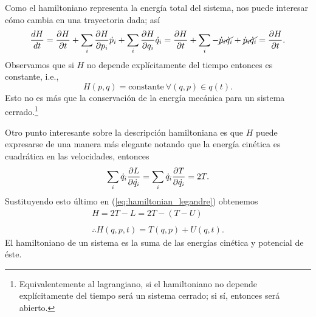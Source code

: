 Como el hamiltoniano representa la energía total del sistema, nos puede interesar cómo cambia en una trayectoria dada; así 
\begin{equation*}
 \frac{dH}{dt} = \frac{\partial H}{\partial t} + \sum_i \frac{\partial H}{\partial p_i}\dot{p}_i + \sum_i \frac{\partial H}{\partial q_i}\dot{q}_i = \frac{\partial H}{\partial t} + \sum_i - \cancel{\dot{p}_i\dot{q}_i} + \cancel{\dot{p}_i\dot{q}_i} = \frac{\partial H}{\partial t}.
\end{equation*}
Observamos que si $H$ no depende explícitamente del tiempo entonces es constante, i.e.,
\begin{equation*}
 H(p,q) = \text{constante} \ \forall (q,p) \in q(t).
\end{equation*} Esto no es más que la conservación de la energía mecánica para un sistema cerrado.\footnote{Equivalentemente al lagrangiano, si el hamiltoniano no depende explícitamente del tiempo será un sistema cerrado; si sí, entonces será abierto.}

Otro punto interesante sobre la descripción hamiltoniana es que $H$ puede expresarse de una manera más elegante notando que la energía cinética es cuadrática en las velocidades, entonces
\begin{align*}
 \sum_i \dot{q}_i \frac{\partial L}{\partial \dot{q_i}} = \sum_i \dot{q}_i \frac{\partial T}{\partial \dot{q_i}} = 2 T.
\end{align*}
Sustituyendo esto último en (\ref{eq:hamiltonian_legandre}) obtenemos
\begin{align}
 H = 2T - L = 2T - \left( T - U \right) \nonumber \\ 
 \nonumber \\
 \therefore H(q,p,t) = T(q,p) + U(q,t).
 \label{eq:hamiltonian}
\end{align}
El hamiltoniano de un sistema es la suma de las energías cinética y potencial de éste. 